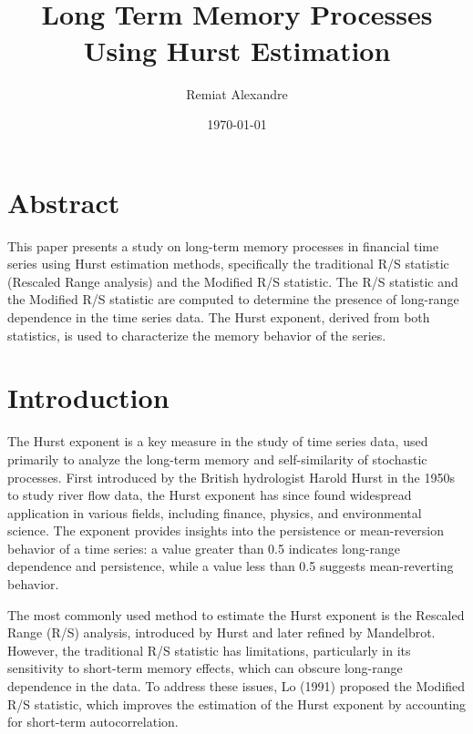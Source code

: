 \documentclass[11pt]{extarticle}
\title{
    \hspace*{-12cm}
    \vspace*{1cm}
    \protect\\
    \vspace*{1cm}
    \textbf{Long Term Memory Processes Using Hurst Estimation}
}
\author{Remiat Alexandre}
\date{\today}
\begin{document}

\maketitle

\vspace{1.5cm}
{
  \hypersetup{linkcolor=black}
  \tableofcontents
}

\newpage


\section*{Abstract}

This paper presents a study on long-term memory processes in financial time series using Hurst estimation methods, specifically the traditional R/S statistic (Rescaled Range analysis) and the Modified R/S statistic.
The R/S statistic and the Modified R/S statistic are computed to determine the presence of long-range dependence in the time series data. The Hurst exponent, derived from both statistics, is used to characterize the memory behavior of the series.


\newpage

\section{Introduction}

The Hurst exponent is a key measure in the study of time series data, used primarily to analyze the long-term memory and self-similarity of stochastic processes. First introduced by the British hydrologist Harold Hurst in the 1950s to study river flow data, the Hurst exponent has since found widespread application in various fields, including finance, physics, and environmental science. The exponent provides insights into the persistence or mean-reversion behavior of a time series: a value greater than 0.5 indicates long-range dependence and persistence, while a value less than 0.5 suggests mean-reverting behavior.

The most commonly used method to estimate the Hurst exponent is the Rescaled Range (R/S) analysis, introduced by Hurst and later refined by Mandelbrot. However, the traditional R/S statistic has limitations, particularly in its sensitivity to short-term memory effects, which can obscure long-range dependence in the data. To address these issues, Lo (1991) proposed the Modified R/S statistic, which improves the estimation of the Hurst exponent by accounting for short-term autocorrelation.
\end{document}
